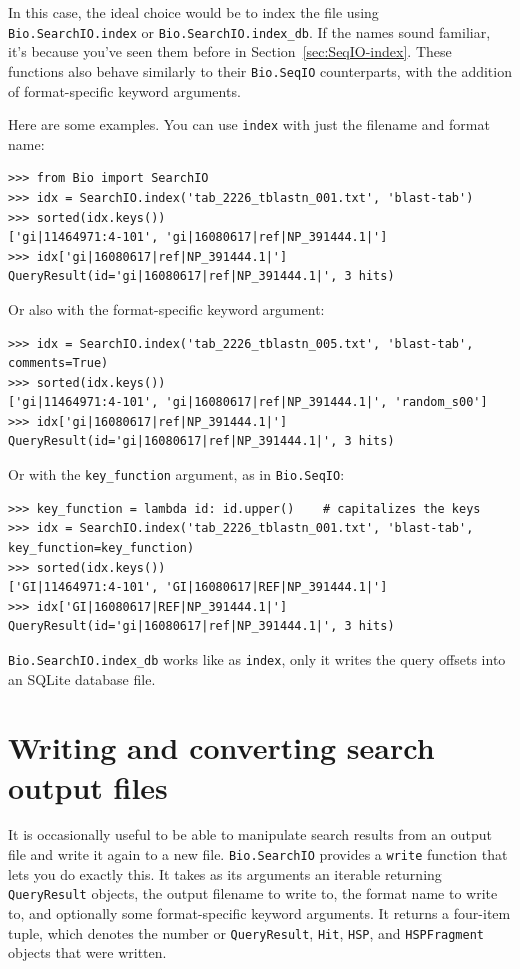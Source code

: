 \documentclass{report}
\begin{document}
In this case, the ideal choice would be to index the file using
\verb|Bio.SearchIO.index| or \verb|Bio.SearchIO.index_db|. If the names sound
familiar, it's because you've seen them before in  Section~\ref{sec:SeqIO-index}.
These functions also behave similarly to their \verb|Bio.SeqIO| counterparts,
with the addition of format-specific keyword arguments.

Here are some examples. You can use \verb|index| with just the filename and
format name:

\begin{verbatim}
>>> from Bio import SearchIO
>>> idx = SearchIO.index('tab_2226_tblastn_001.txt', 'blast-tab')
>>> sorted(idx.keys())
['gi|11464971:4-101', 'gi|16080617|ref|NP_391444.1|']
>>> idx['gi|16080617|ref|NP_391444.1|']
QueryResult(id='gi|16080617|ref|NP_391444.1|', 3 hits)
\end{verbatim}

Or also with the format-specific keyword argument:

\begin{verbatim}
>>> idx = SearchIO.index('tab_2226_tblastn_005.txt', 'blast-tab', comments=True)
>>> sorted(idx.keys())
['gi|11464971:4-101', 'gi|16080617|ref|NP_391444.1|', 'random_s00']
>>> idx['gi|16080617|ref|NP_391444.1|']
QueryResult(id='gi|16080617|ref|NP_391444.1|', 3 hits)
\end{verbatim}

Or with the \verb|key_function| argument, as in \verb|Bio.SeqIO|:

\begin{verbatim}
>>> key_function = lambda id: id.upper()    # capitalizes the keys
>>> idx = SearchIO.index('tab_2226_tblastn_001.txt', 'blast-tab', key_function=key_function)
>>> sorted(idx.keys())
['GI|11464971:4-101', 'GI|16080617|REF|NP_391444.1|']
>>> idx['GI|16080617|REF|NP_391444.1|']
QueryResult(id='gi|16080617|ref|NP_391444.1|', 3 hits)
\end{verbatim}

\verb|Bio.SearchIO.index_db| works like as \verb|index|, only it writes the
query offsets into an SQLite database file.

\section{Writing and converting search output files}
\label{sec:searchio-write}

It is occasionally useful to be able to manipulate search results from an output
file and write it again to a new file. \verb|Bio.SearchIO| provides a
\verb|write| function that lets you do exactly this. It takes as its arguments
an iterable returning \verb|QueryResult| objects, the output filename to write
to, the format name to write to, and optionally some format-specific keyword
arguments. It returns a four-item tuple, which denotes the number or
\verb|QueryResult|, \verb|Hit|, \verb|HSP|, and \verb|HSPFragment| objects that
were written.
\end{document}
